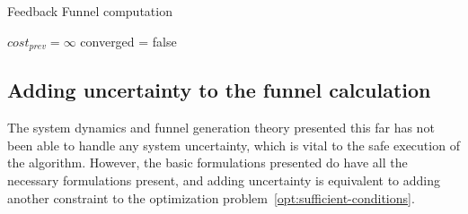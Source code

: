 \begin{algorithm}[H]
  \caption{Feedback Funnel computation}
  \label{alg:funnelalgorithm-extended}
  \DontPrintSemicolon \SetAlgoNoLine

   

  \(cost_{prev} = \infty\)\; converged = false \; \;
\end{algorithm}


\subsection{Adding uncertainty to the funnel calculation}
\label{sec:adding-uncertainty}

The system dynamics and funnel generation theory presented this far has not been
able to handle any system uncertainty, which is vital to the safe execution of
the \rrtfunnel{} algorithm. However, the basic formulations presented do have
all the necessary formulations present, and adding uncertainty is equivalent to
adding another constraint to the optimization
problem~\cref{opt:sufficient-conditions}.

